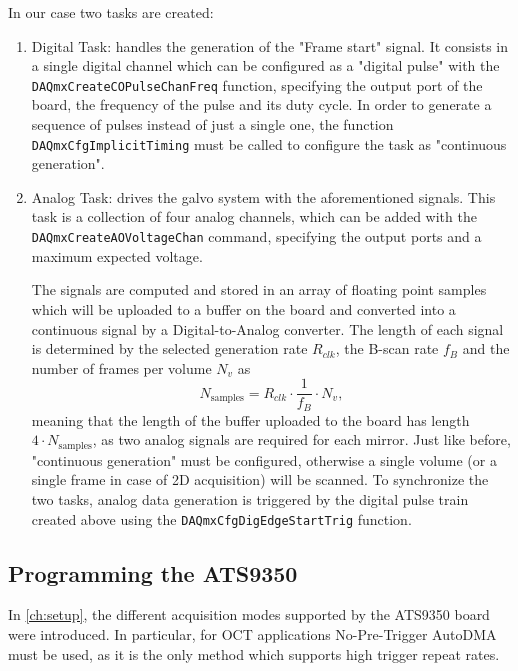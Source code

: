 In our case two tasks are created:
\begin{enumerate}
	\item Digital Task: handles the generation of the "Frame start" signal. It consists in a single digital channel which can be configured as a "digital pulse" with the \texttt{DAQmxCreateCOPulseChanFreq} function, specifying the output port of the board, the frequency of the pulse and its duty cycle. In order to generate a sequence of pulses instead of just a single one, the function \texttt{DAQmxCfgImplicitTiming} must be called to configure the task as "continuous generation". 


	
	\item Analog Task: drives the galvo system with the aforementioned signals. This task is a collection of four analog channels, which can be added with the \texttt{DAQmxCreateAOVoltageChan} command, specifying the output ports and a maximum expected voltage. 
	
	The signals are computed and stored in an array of floating point samples which will be uploaded to a buffer on the board and converted into a continuous signal by a Digital-to-Analog converter. The length of each signal is determined by the selected generation rate $R_{clk}$, the B-scan rate $f_B$ and the number of frames per volume $N_v$ as 
	\begin{equation}
		N_{\text{samples}} = R_{clk} \cdot \frac{1}{f_B} \cdot N_v,
	\end{equation}
	meaning that the length of the buffer uploaded to the board has length $4 \cdot N_{\text{samples}}$, as two analog signals are required for each mirror. Just like before, "continuous generation" must be configured, otherwise a single volume (or a single frame in case of 2D acquisition) will be scanned. To synchronize the two tasks, analog data generation is triggered by the digital pulse train created above using the \texttt{DAQmxCfgDigEdgeStartTrig} function. 
		
\end{enumerate}


\subsection{Programming the ATS9350}
In \autoref{ch:setup}, the different acquisition modes supported by the ATS9350 board were introduced. In particular, for OCT applications No-Pre-Trigger AutoDMA must be used, as it is the only method which supports high trigger repeat rates. 

